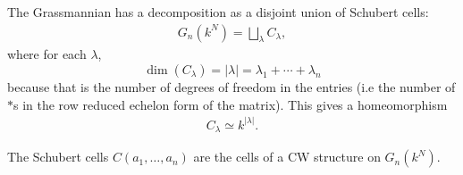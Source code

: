 \documentclass[a4paper,openany]{scrbook}
\begin{document}
The Grassmannian has a decomposition as a disjoint union of Schubert cells:
\begin{align*}
\displaystyle G_n(k^N) = \bigsqcup_{\lambda} C_{\lambda},
\end{align*} \noindent
where for each $\lambda$,
\[
\dim(C_\lambda) = |\lambda| = \lambda_1 + \cdots + \lambda_n
\] 
because that is the number of degrees of freedom in the entries (i.e the number of $*$s in the row reduced echelon form of the matrix). This gives a homeomorphism 
\begin{align}
\label{schubertcellaffine}
C_{\lambda} \simeq k^{|\lambda|}.
\end{align}

\begin{prop}\label{prop:GrassmannianCWstructure}
The Schubert cells $C(a_1,\dots ,a_n)$ are the cells of a CW structure on $G_n(k^N)$.
\end{prop}
\end{document}
